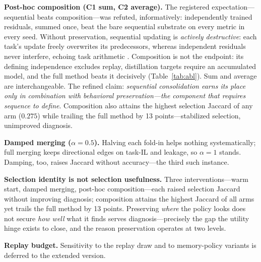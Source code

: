 \documentclass{article}
\begin{document}
\textbf{Post-hoc composition (C1 sum, C2 average).} The registered expectation---sequential beats composition---was refuted, informatively: independently trained residuals, summed once, beat the bare sequential substrate on every metric in every seed. Without preservation, sequential updating is \emph{actively destructive}: each task's update freely overwrites its predecessors, whereas independent residuals never interfere, echoing task arithmetic \cite{ilharco2023task}. Composition is not the endpoint: its defining independence excludes replay, distillation targets require an accumulated model, and the full method beats it decisively (Table~\ref{tab:abl}). Sum and average are interchangeable. The refined claim: \emph{sequential consolidation earns its place only in combination with behavioral preservation---the component that requires sequence to define}. Composition also attains the highest selection Jaccard of any arm ($0.275$) while trailing the full method by 13 points---stabilized selection, unimproved diagnosis.

\textbf{Damped merging ($\alpha{=}0.5$).} Halving each fold-in helps nothing systematically; full merging keeps directional edges on task-IL and leakage, so $\alpha{=}1$ stands. Damping, too, raises Jaccard without accuracy---the third such instance.

\textbf{Selection identity is not selection usefulness.} Three interventions---warm start, damped merging, post-hoc composition---each raised selection Jaccard without improving diagnosis; composition attains the highest Jaccard of all arms yet trails the full method by 13 points. Preserving \emph{where} the policy looks does not secure \emph{how well} what it finds serves diagnosis---precisely the gap the utility hinge exists to close, and the reason preservation operates at two levels.

\textbf{Replay budget.} Sensitivity to the replay draw and to memory-policy variants is deferred to the extended version.
\end{document}
